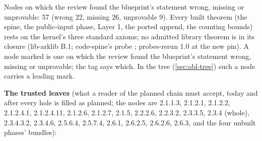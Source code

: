 Nodes on which the review found the blueprint's statement wrong, missing or unprovable: 57 (wrong 22, missing 26, unprovable 9). Every built theorem (the spine, the public-input phase, Layer 1, the ported append, the counting bounds) rests on the kernel's three standard axioms; no admitted library theorem is in its closure (lib-arklib B.1; code-spine's probe ; probes-rerun 1.0 at the new pin). A node marked  is one on which the review found the blueprint's statement wrong, missing or unprovable; the tag says which. In the tree (\cref{sec:obl-tree}) such a node carries a leading \oblflag mark.

\textbf{The trusted leaves} (what a reader of the planned chain must accept, today and after every hole is filled as planned; the nodes are 2.1.1.3, 2.1.2.1, 2.1.2.2, 2.1.2.4.1, 2.1.2.4.11, 2.1.2.6, 2.1.2.7, 2.1.5, 2.2.2.6, 2.2.3.2, 2.3.3.5, 2.3.4 (whole), 2.3.4.3.2, 2.3.4.6, 2.5.6.4, 2.5.7.4, 2.6.1, 2.6.2.5, 2.6.2.6, 2.6.3, and the four unbuilt phases' bundles):

